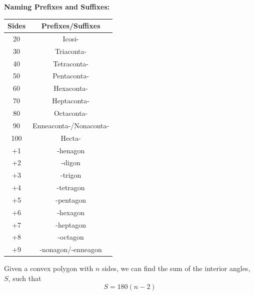        \noindent \color{purple} \textbf{Naming Prefixes and Suffixes: } \color{black} \\

        \begin{center}
            \begin{tabular}{|c|c|}
                \hline
                \textbf{Sides} & \textbf{Prefixes/Suffixes} \\
                \hline
                20 & Icosi- \\
                \hline
                30 & Triaconta- \\
                \hline
                40 & Tetraconta- \\
                \hline
                50 & Pentaconta- \\
                \hline
                60 & Hexaconta- \\
                \hline
                70 & Heptaconta- \\
                \hline
                80 & Octaconta- \\
                \hline
                90 & Enneaconta-/Nonaconta- \\
                \hline
                100 & Hecta- \\
                \hline
                +1 & -henagon \\
                \hline
                +2 & -digon \\
                \hline
                +3 & -trigon \\
                \hline
                +4 & -tetragon \\
                \hline
                +5 & -pentagon \\
                \hline
                +6 & -hexagon \\
                \hline
                +7 & -heptagon \\
                \hline
                +8 & -octagon \\
                \hline
                +9 & -nonagon/-enneagon \\
                \hline
            \end{tabular}
        \end{center}

        \noindent Given a convex polygon with $n$ sides, we can find the sum of the interior
        angles, $S$, such that \\

        \begin{equation*}
            S = 180(n-2)
        \end{equation*}

